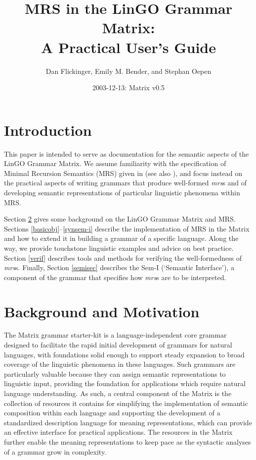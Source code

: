 \documentclass[12pt]{article}
\title{MRS in the LinGO Grammar Matrix:\\ A Practical User's Guide}
\author{Dan Flickinger, Emily M. Bender, and Stephan Oepen}
\date{2003-12-13: Matrix v0.5}
\begin{document}
\maketitle

\setcounter{tocdepth}{2}  %
\tableofcontents
\newpage
\section{Introduction}

This paper is intended to serve as documentation for the semantic
aspects of the LinGO Grammar Matrix. We assume familiarity with the
specification of Minimal Recursion Semantics (MRS) given in
 (see also ),
and focus instead on the practical aspects of writing grammars
that produce well-formed {\it mrs}s and of developing semantic
representations of particular linguistic phenomena within MRS.

Section \ref{backmot} gives some background on the LinGO Grammar
Matrix and MRS.  Sections \ref{basicobj}--\ref{synsem-i} describe
the implementation of MRS in the Matrix and how to extend it in
building a grammar of a specific language.  Along the way, we
provide touchstone linguistic examples and advice on best practice.
Section \ref{verif} describes tools
and methods for verifying the well-formedness of {\it mrs}s.  Finally,
Section \ref{semisec} describes the Sem-I (`Semantic Interface'), a component
of the grammar that specifies how {\it mrs}s are to be interpreted.

\section{Background and Motivation}
\label{backmot}

The Matrix grammar starter-kit
\cite{Ben:Fli:Oep:02,Fli:Ben:03,Ben:Fli:05,Dre:Ben:05} is a
language-independent core grammar designed to facilitate the rapid
initial development of grammars for natural languages, with
foundations solid enough to support steady expansion to broad coverage
of the linguistic phenomena in these languages.  Such grammars are
particularly valuable because they can assign semantic representations
to linguistic input, providing the foundation for applications which
require natural language understanding.  As such, a central component
of the Matrix is the collection of resources it contains for
simplifying the implementation of semantic composition within each
language and supporting the development of a standardized description
language for meaning representations, which can provide an effective
interface for practical applications.  The resources in the Matrix
further enable the meaning representations to keep pace as the
syntactic analyses of a grammar grow in complexity.
\end{document}
